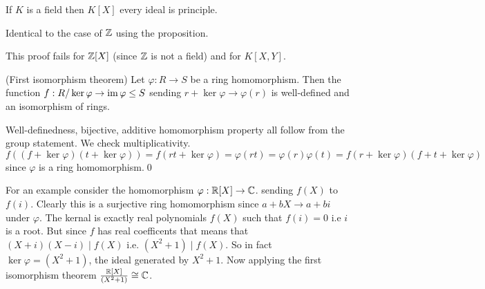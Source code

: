 \documentclass{article}
\begin{document}
\begin{corollary}
	If $ K $ is a field then $ K[X] $ every ideal is principle.
\end{corollary}
\pf Identical to the case of $ \mathbb{Z} $ using the proposition.\par
This proof fails for $ \mathbb{Z} [X] $ (since $ \mathbb{Z} $ is not a field) and for $ K[X,Y] $.
\begin{theorem}
	(First isomorphism theorem) Let $ \varphi:R\to S $ be a ring homomorphism. Then the function $ f:R/\ker\varphi\to\operatorname{im}\varphi\le S $ sending $ r+\ker\varphi\to\varphi(r) $ is well-defined and an isomorphism of rings.
\end{theorem}
\pf Well-definedness, bijective, additive homomorphism property all follow from the group statement. We check multiplicativity. $ f((f+\ker\varphi)(t+\ker\varphi))=f(rt+\ker\varphi)=\varphi(rt)=\varphi(r)\varphi(t)=f(r+\ker\varphi)(f+t+\ker\varphi) $ since $ \varphi $ is a ring homomorphism.\qed
\par
For an example consider the homomorphism $ \varphi:\mathbb{R}[X]\to \mathbb{C} $. sending $ f(X) $ to $ f(i) $. Clearly this is a surjective ring homomorphism since $ a+bX\to a+bi $ under $ \varphi $. The kernal is exactly real polynomials $ f(X) $ such that $ f(i)=0 $ i.e $ i $ is a root. But since $ f $ has real coefficents that means that $ (X+i)(X-i)\mid f(X) $ i.e. $ (X^2+1)\mid f(X) $. So in fact $ \ker\varphi=(X^2+1) $, the ideal generated by $ X^2+1 $. Now applying the first isomorphism theorem $ \frac{\mathbb{R}[X]}{(X^2+1)}\cong \mathbb{C} $.
\end{document}
